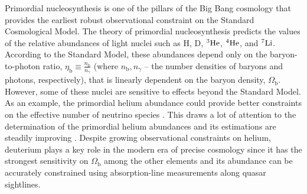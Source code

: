 \documentclass[fleqn,usenatbib]{mnras}
\begin{document}
Primordial nucleosynthesis is one of the pillars of the Big Bang cosmology that provides the earliest robust observational constraint on the Standard Cosmological Model. The theory of primordial nucleosynthesis predicts the values of the relative abundances of light nuclei such as H, D, $\rm ^3He$, $\rm ^4He$, and $\rm ^7Li$.  According to the Standard Model, these abundances depend only on the baryon-to-photon ratio, $\eta_{\mathrm{b}} \equiv \frac{n_{\mathrm{b}}}{n_\gamma}$ (where $n_{\mathrm{b}}, n_\gamma$ -- the number densities of baryons and photons, respectively), that is linearly dependent on the baryon density, $\Omega_{\mathrm{b}}$. However, some of these nuclei are sensitive to effects beyond the Standard Model. As an example, the primordial helium abundance could provide better constraints on the effective number of neutrino species \citep{Kurichin2021}. This draws a lot of attention to the determination of the primordial helium abundances and its estimations are steadily improving \citep[e.g.,][]{Izotov_2014, Fernandez, Hsyu_2020, Aver2021, Kurichin2021_2, Valerdi, EMPRESS_2022}. Despite growing observational constraints on helium, deuterium plays a key role in the modern era of precise cosmology since it has the strongest sensitivity on $\Omega_{\mathrm{b}}$ among the other elements and its abundance can be accurately constrained using absorption-line measurements along quasar sightlines.

\end{document}
